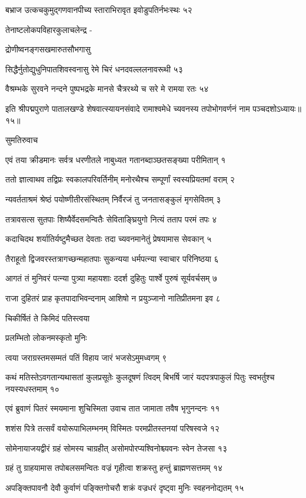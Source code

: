बभ्राज उत्कचकुमुद्गणवानपीच्य
स्ताराभिरावृत इवोडुपतिर्नभःस्थः ५२

तेनाष्टलोकपविहारकुलाचलेन्द्र -

द्रोणीष्वनङ्गसखमारुतसौभगासु

सिद्धैर्नुतोद्युधुनिपातशिवस्वनासु
रेमे चिरं धनदवल्ललनावरूथी ५३

वैश्रम्भके सुरवने नन्दने पुष्पभद्रके
मानसे चैत्ररथ्ये च सरे मे रामया रतः ५४

इति श्रीपद्मपुराणे पातालखण्डे शेषवात्स्यायनसंवादे रामाश्वमेधे च्यवनस्य तपोभोगवर्णनं नाम पञ्चदशोऽध्यायः॥१५॥


सुमतिरुवाच

एवं तया क्रीडमानः सर्वत्र धरणीतले
नाबुध्यत गतानब्दाञ्छतसङ्ख्या परीमितान् १

ततो ज्ञात्वाथव तद्विप्रः स्वकालपरिवर्तिनीम्
मनोरथैश्च सम्पूर्णां स्वस्यप्रियतमां वराम् २

न्यवर्तताश्रमं श्रेष्ठं पयोष्णीतीरसंस्थितम्
निर्वैरजं तु जनतासङ्कुलं मृगसेवितम् ३

तत्रावसत्स सुतपाः शिष्यैर्वेदसमन्वितैः
सेविताङ्घ्रियुगो नित्यं तताप परमं तपः ४

कदाचिदथ शर्यातिर्यष्टुमैच्छत देवताः
तदा च्यवनमानेतुं प्रेषयामास सेवकान् ५

तैराहूतो द्विजवरस्तत्रागच्छन्महातपाः
सुकन्यया धर्मपत्न्या स्वाचार परिनिष्ठया ६

आगतं तं मुनिवरं पत्न्या पुत्र्या महायशाः
ददर्श दुहितुः पार्श्वे पुरुषं सूर्यवर्चसम् ७

राजा दुहितरं प्राह कृतपादाभिवन्दनाम्
आशिषो न प्रयुञ्जानो नातिप्रीतमना इव ८

चिकीर्षितं ते किमिदं पतिस्त्वया

प्रलम्भितो लोकनमस्कृतो मुनिः

त्वया जराग्रस्तमसम्मतं पतिं
विहाय जारं भजसेऽमुमध्वगम् ९

कथं मतिस्तेऽवगतान्यथासतां कुलप्रसूतेः कुलदूषणं त्विदम्
बिभर्षि जारं यदपत्रपाकुलं पितुः स्वभर्तुश्च नयस्यधस्तमाम् १०

एवं ब्रुवाणं पितरं स्मयमाना शुचिस्मिता
उवाच तात जामाता तवैष भृगुनन्दनः ११

शशंस पित्रे तत्सर्वं वयोरूपाभिलम्भनम्
विस्मितः परमप्रीतस्तनयां परिषस्वजे १२

सोमेनायाजयद्वीरं ग्रहं सोमस्य चाग्रहीत्
असोमपोरप्यश्विनोश्च्यवनः स्वेन तेजसा १३

ग्रहं तु ग्राहयामास तपोबलसमन्वितः
वज्रं गृहीत्वा शक्रस्तु हन्तुं ब्राह्मणसत्तमम् १४

अपङ्क्तिपावनौ देवौ कुर्वाणं पङ्क्तिगोचरौ
शक्रं वज्रधरं दृष्ट्वा मुनिः स्वहननोद्यतम् १५

